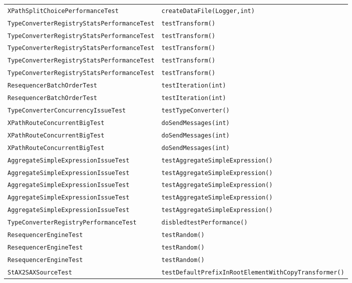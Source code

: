 \begin{center}
\begin{longtable}{ll}
\lstinline/XPathSplitChoicePerformanceTest/&{\lstinline/createDataFile(Logger,int)/}\\
\lstinline/TypeConverterRegistryStatsPerformanceTest/&{\lstinline/testTransform()/}\\
\lstinline/TypeConverterRegistryStatsPerformanceTest/&{\lstinline/testTransform()/}\\
\lstinline/TypeConverterRegistryStatsPerformanceTest/&{\lstinline/testTransform()/}\\
\lstinline/TypeConverterRegistryStatsPerformanceTest/&{\lstinline/testTransform()/}\\
\lstinline/TypeConverterRegistryStatsPerformanceTest/&{\lstinline/testTransform()/}\\
\lstinline/ResequencerBatchOrderTest/&{\lstinline/testIteration(int)/}\\
\lstinline/ResequencerBatchOrderTest/&{\lstinline/testIteration(int)/}\\
\lstinline/TypeConverterConcurrencyIssueTest/&{\lstinline/testTypeConverter()/}\\
\lstinline/XPathRouteConcurrentBigTest/&{\lstinline/doSendMessages(int)/}\\
\lstinline/XPathRouteConcurrentBigTest/&{\lstinline/doSendMessages(int)/}\\
\lstinline/XPathRouteConcurrentBigTest/&{\lstinline/doSendMessages(int)/}\\
\lstinline/AggregateSimpleExpressionIssueTest/&{\lstinline/testAggregateSimpleExpression()/}\\
\lstinline/AggregateSimpleExpressionIssueTest/&{\lstinline/testAggregateSimpleExpression()/}\\
\lstinline/AggregateSimpleExpressionIssueTest/&{\lstinline/testAggregateSimpleExpression()/}\\
\lstinline/AggregateSimpleExpressionIssueTest/&{\lstinline/testAggregateSimpleExpression()/}\\
\lstinline/AggregateSimpleExpressionIssueTest/&{\lstinline/testAggregateSimpleExpression()/}\\
\lstinline/TypeConverterRegistryPerformanceTest/&{\lstinline/disbledtestPerformance()/}\\
\lstinline/ResequencerEngineTest/&{\lstinline/testRandom()/}\\
\lstinline/ResequencerEngineTest/&{\lstinline/testRandom()/}\\
\lstinline/ResequencerEngineTest/&{\lstinline/testRandom()/}\\
\lstinline/StAX2SAXSourceTest/&{\lstinline/testDefaultPrefixInRootElementWithCopyTransformer()/}\\

\end{longtable}
\end{center}
